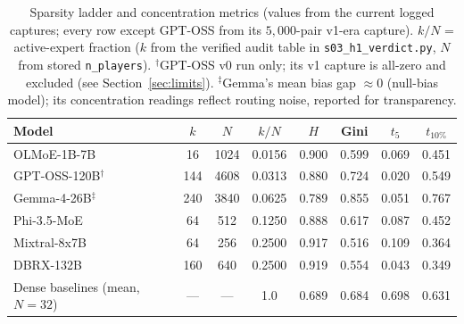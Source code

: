 \documentclass[sigconf]{acmart}
\begin{document}
\begin{table}[t]
\centering\small
\begin{tabular}{lccccccc}
\toprule
Model & $k$ & $N$ & $k/N$ & $H$ & Gini & $t_5$ & $t_{10\%}$ \\
\midrule
OLMoE-1B-7B          & 16  & 1024 & 0.0156 & 0.900 & 0.599 & 0.069 & 0.451 \\
GPT-OSS-120B$^{\dagger}$ & 144 & 4608 & 0.0313 & 0.880 & 0.724 & 0.020 & 0.549 \\
Gemma-4-26B$^{\ddagger}$ & 240 & 3840 & 0.0625 & 0.789 & 0.855 & 0.051 & 0.767 \\
Phi-3.5-MoE         & 64  & 512  & 0.1250 & 0.888 & 0.617 & 0.087 & 0.452 \\
Mixtral-8x7B        & 64  & 256  & 0.2500 & 0.917 & 0.516 & 0.109 & 0.364 \\
DBRX-132B           & 160 & 640  & 0.2500 & 0.919 & 0.554 & 0.043 & 0.349 \\
\midrule
Dense baselines (mean, $N{=}32$) & --- & --- & 1.0 & 0.689 & 0.684 & 0.698 & 0.631 \\
\bottomrule
\end{tabular}
\caption{Sparsity ladder and concentration metrics (values from the
current logged captures; every row except GPT-OSS from its $5{,}000$-pair
v1-era capture). $k/N$ = active-expert fraction
($k$ from the verified audit table in \texttt{s03\_h1\_verdict.py}, $N$ from
stored \texttt{n\_players}). $^{\dagger}$GPT-OSS v0 run only; its v1 capture
is all-zero and excluded (see Section~\ref{sec:limits}).
$^{\ddagger}$Gemma's mean bias gap $\approx 0$ (null-bias model); its
concentration readings reflect routing noise, reported for transparency.}
\label{tab:ladder}
\end{table}
\end{document}
